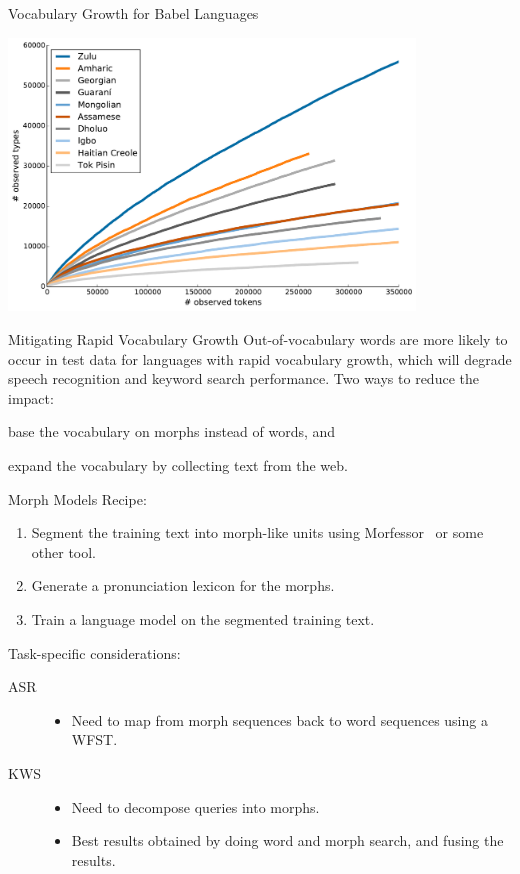 \begin{frame}{Vocabulary Growth for Babel Languages}{}
  \begin{center}
    \includegraphics[width=108mm]{figures/vocGrowth}
  \end{center}
\end{frame}

\begin{frame}{Mitigating Rapid Vocabulary Growth}{}
  Out-of-vocabulary words are more likely to occur in test data for
  languages with rapid vocabulary growth, which will degrade speech
  recognition and keyword search performance.
  \vfill
  Two ways to reduce the impact:
  \begin{description}
    \item[morph models] base the vocabulary on morphs instead of
      words, and
    \item[web text] expand the vocabulary by collecting text from the
      web.
  \end{description}
\end{frame}

\begin{frame}{Morph Models}{}
  Recipe:
  \begin{enumerate}
  \item Segment the training text into morph-like units using
    Morfessor~\cite{Morfessor} or some other tool.
  \item Generate a pronunciation lexicon for the morphs.
  \item Train a language model on the segmented training text.
  \end{enumerate}
  \vfill
  Task-specific considerations:
  \begin{description}
  \item[ASR]
    \begin{itemize}
    \item Need to map from morph sequences back to word sequences using a WFST.
    \end{itemize}
  \item[KWS]
    \begin{itemize}
      \item Need to decompose queries into morphs.
      \item Best results obtained by doing word and morph search, and
        fusing the results.
    \end{itemize}
  \end{description}
\end{frame}

